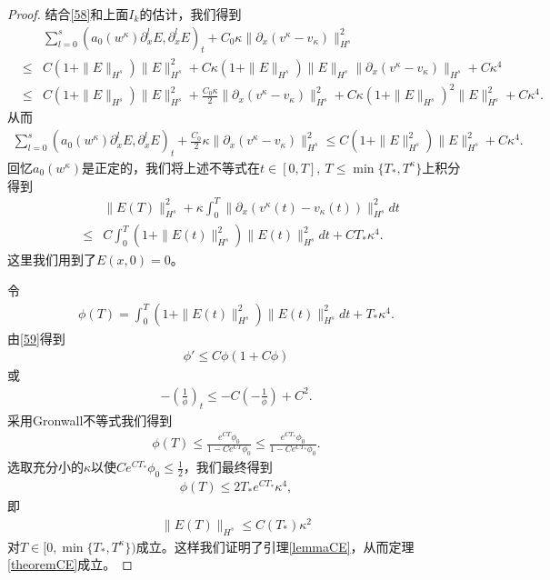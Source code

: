 \begin{proof}
结合\eqref{58}和上面$I_k$的估计，我们得到
\begin{eqnarray*}
 && \sum_{l=0}^s  (a_0(w^\kappa) \partial^l_x E,\partial^l_x E)_t + C_0 \kappa \|\partial_x (v^\kappa-v_\kappa)\|_{H^s}^2 \\
 &\le& C (1+\|E\|_{H^s})\|E\|_{H^s}^2 + C \kappa(1+\|E\|_{H^s})\|E\|_{H^s} \|\partial_x(v^\kappa-v_\kappa)\|_{H^s} + C \kappa^4  \\
 &\le& C (1+\|E\|_{H^s})\|E\|_{H^s}^2 + \frac{C_0\kappa}{2} \|\partial_x(v^\kappa-v_\kappa)\|_{H^s}^2 + C \kappa (1+\|E\|_{H^s})^2 \|E\|_{H^s}^2 + C \kappa^4.
\end{eqnarray*}
从而
\begin{eqnarray*}
  \sum_{l=0}^s  (a_0(w^\kappa) \partial^l_x E,\partial^l_x E)_t + \frac{C_0}{2} \kappa \|\partial_x (v^\kappa-v_\kappa)\|_{H^s}^2 \le   C (1+\|E\|_{H^s}^2)\|E\|_{H^s}^2 + C \kappa^4.
\end{eqnarray*}
回忆$a_0(w^\kappa)$是正定的，我们将上述不等式在$t \in [0,T],\ T \le \min \{T_*,T^\kappa\}$上积分得到
\begin{eqnarray} \label{59}
 && \|E(T)\|_{H^s}^2 + \kappa \int_0^T \|\partial_x(v^\kappa(t)-v_\kappa(t))\|_{H^s}^2 dt \nonumber \\
& \le &  C\int_0^T (1+\|E(t)\|_{H^s}^2)\|E(t)\|_{H^s}^2 dt +CT_* \kappa^4.
\end{eqnarray}
这里我们用到了$E(x, 0)=0$。

令
\begin{eqnarray*}
  \phi(T) =  \int_0^T (1+\|E(t)\|_{H^s}^2)\|E(t)\|_{H^s}^2 dt + T_* \kappa^4.
\end{eqnarray*}
由\eqref{59}得到
\begin{eqnarray*}
  \phi' \le C  \phi(1+C\phi)
\end{eqnarray*}
或
\begin{eqnarray*}
  -(\frac{1}{\phi})_t \le -C (-\frac{1}{\phi})+C^2.
\end{eqnarray*}
采用Gronwall不等式我们得到
\begin{eqnarray*}
  \phi(T) \le \frac{e^{CT} \phi_0}{1-C e^{CT}  \phi_0}\le\frac{e^{CT_*} \phi_0}{1-C e^{CT_*} \phi_0} .
\end{eqnarray*}
选取充分小的$\kappa$以使$C e^{CT_*} \phi_0 \le \frac{1}{2}$，我们最终得到
\begin{eqnarray*}
  \phi(T) \le 2T_*e^{CT_*}\kappa^4,
\end{eqnarray*}
即
\begin{eqnarray*}
  \|E(T)\|_{H^s} \le C(T_*) \kappa^2
\end{eqnarray*}
对$T \in [0,\min\{T_*,T^\kappa\})$成立。这样我们证明了引理\ref{lemmaCE}，从而定理\ref{theoremCE}成立。
\end{proof}

% 
% 






